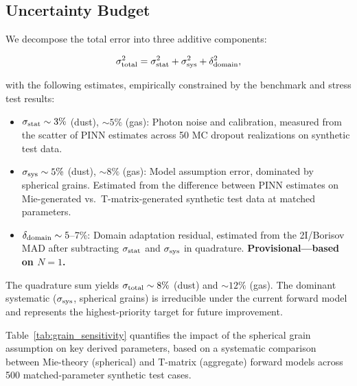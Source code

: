 \documentclass[preprint2]{aastex631}
\begin{document}
\subsection{Uncertainty Budget}\label{sec:uncertainty_budget}

We decompose the total error into three additive components:

\begin{equation}
\sigma_{\rm total}^2 = \sigma_{\rm stat}^2 + \sigma_{\rm sys}^2 + \delta_{\rm domain}^2,
\end{equation}

with the following estimates, empirically constrained by the benchmark and stress test results:

\begin{itemize}
    \item $\sigma_{\rm stat} \sim 3\%$ (dust), $\sim 5\%$ (gas): Photon noise and calibration, measured from the scatter of PINN estimates across 50 MC dropout realizations on synthetic test data.
    \item $\sigma_{\rm sys} \sim 5\%$ (dust), $\sim 8\%$ (gas): Model assumption error, dominated by spherical grains. Estimated from the difference between PINN estimates on Mie-generated vs.\ T-matrix-generated synthetic test data at matched parameters.
    \item $\delta_{\rm domain} \sim 5$--7\%: Domain adaptation residual, estimated from the 2I/Borisov MAD after subtracting $\sigma_{\rm stat}$ and $\sigma_{\rm sys}$ in quadrature. \textbf{Provisional---based on $N=1$.}
\end{itemize}

The quadrature sum yields $\sigma_{\rm total} \sim 8\%$ (dust) and $\sim 12\%$ (gas). The dominant systematic ($\sigma_{\rm sys}$, spherical grains) is irreducible under the current forward model and represents the highest-priority target for future improvement.

Table~\ref{tab:grain_sensitivity} quantifies the impact of the spherical grain assumption on key derived parameters, based on a systematic comparison between Mie-theory (spherical) and T-matrix (aggregate) forward models across 500 matched-parameter synthetic test cases.
\end{document}
